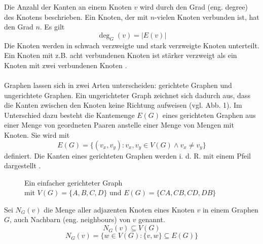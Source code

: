 \noindent Die Anzahl der Kanten an einem Knoten $v$ wird durch den Grad (eng. degree) des Knotens beschrieben. 
Ein Knoten, der mit $n$-vielen Knoten verbunden ist, hat den Grad $n$. Es gilt
$$\deg_G(v) = |E(v)|$$
Die Knoten werden in schwach verzweigte und stark verzweigte Knoten unterteilt. 
Ein Knoten mit z.B. acht verbundenen Knoten ist stärker verzweigt als ein Knoten mit zwei verbundenen Knoten \parencite[5]{Diestel2017-bj}.\\\\
Graphen lassen sich in zwei Arten unterscheiden: gerichtete Graphen und ungerichtete Graphen. Ein ungerichteter Graph zeichnet sich dadurch aus, dass die Kanten zwischen den Knoten keine Richtung aufweisen (vgl. Abb. 1). Im Unterschied dazu besteht die Kantemenge $E(G)$ eines gerichteten Graphen aus einer Menge von geordneten Paaren anstelle einer Menge von Mengen mit Knoten. Sie wird mit
\begin{equation*}
    E(G) = \{(v_x, v_y) \colon v_x,v_y \in V(G) \wedge v_x \neq v_y\}
\end{equation*}
definiert. Die Kanten eines gerichteten Graphen werden i. d. R. mit einem Pfeil dargestellt \parencite[30]{Diestel2017-bj}.
\begin{figure}[H]
    \centering
    
    \caption[caption]{Ein einfacher gerichteter Graph\\ mit $V(G)=\{A,B,C,D\}$ und $E(G)=\{CA,CB,CD,DB\}$}
\end{figure}
\noindent Sei $N_G(v)$ die Menge aller adjazenten Knoten eines Knoten $v$ in einem Graphen $G$, auch Nachbarn (eng. neighbours) von $v$ genannt. \parencite[5]{Diestel2017-bj}
\begin{equation*}
    N_G(v) \subseteq V(G)
\end{equation*}
\begin{equation*}
    N_G(v)=\{w \in V(G) \colon \{v,w\} \subseteq E(G)  \}
\end{equation*}

